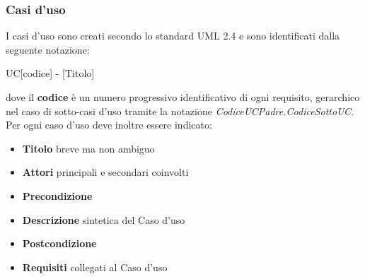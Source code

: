 \documentclass[12pt,a4paper]{article}
\begin{document}
\subsubsection{Casi d'uso}
I casi d'uso sono creati secondo lo standard UML 2.4 e sono identificati dalla seguente notazione:
\begin{center}
	UC[codice] - [Titolo]
\end{center}
dove il \textbf{codice} è un numero progressivo identificativo di ogni requisito, gerarchico nel  caso di sotto-casi d'uso tramite la notazione \textit{CodiceUCPadre.CodiceSottoUC}. Per ogni caso d'uso deve inoltre essere indicato:
\begin{itemize}
	\item \textbf{Titolo} breve ma non ambiguo
	\item \textbf{Attori} principali e secondari coinvolti
	\item \textbf{Precondizione}
	\item \textbf{Descrizione} sintetica del Caso d'uso
	\item \textbf{Postcondizione}
	\item \textbf{Requisiti} collegati al Caso d'uso
\end{itemize}
\end{document}
